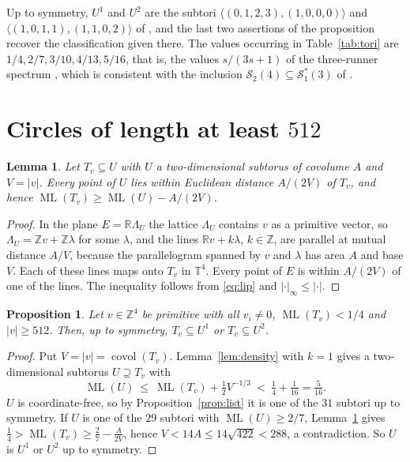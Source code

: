 \documentclass[12pt]{amsart}
\newtheorem{lemma}[theorem]{Lemma}
\newtheorem{proposition}[theorem]{Proposition}
\theoremstyle{definition}\newtheorem{definition}[theorem]{Definition}
\theoremstyle{remark}\newtheorem{remark}[theorem]{Remark}
\newcommand{\Z}{\mathbb Z}\newcommand{\R}{\mathbb R}\newcommand{\T}{\mathbb T}
\newcommand{\ML}{\operatorname{ML}}
\newcommand{\covol}{\operatorname{covol}}
\newcommand{\supn}[1]{\lvert #1\rvert_\infty}
\newcommand{\eucl}[1]{\lvert #1\rvert}
\newcommand{\Uone}{U^{1}}\newcommand{\Utwo}{U^{2}}
\begin{document}
Up to symmetry, $\Uone$ and $\Utwo$ are the subtori $\langle(0,1,2,3),(1,0,0,0)\rangle$ and $\langle(1,0,1,1),(1,1,0,2)\rangle$ of \cite[Section~3.3]{JainKravitz}, and the last two assertions of the proposition recover the classification given there. The values occurring in Table~\ref{tab:tori} are $1/4,2/7,3/10,4/13,5/16$, that is, the values $s/(3s+1)$ of the three-runner spectrum \cite[Theorem~7.2]{Kravitz}, which is consistent with the inclusion $\mathcal S_2(4)\subseteq\mathcal S^*_1(3)$ of \cite{GiriKravitz}.

\section{Circles of length at least $512$}
\begin{lemma}\label{lem:strip}
Let $T_v\subseteq U$ with $U$ a two-dimensional subtorus of covolume $A$ and $V=\eucl v$. Every point of $U$ lies within Euclidean distance $A/(2V)$ of $T_v$, and hence $\ML(T_v)\ge\ML(U)-A/(2V)$.
\end{lemma}
\begin{proof}
In the plane $E=\R\Lambda_U$ the lattice $\Lambda_U$ contains $v$ as a primitive vector, so $\Lambda_U=\Z v+\Z\lambda$ for some $\lambda$, and the lines $\R v+k\lambda$, $k\in\Z$, are parallel at mutual distance $A/V$, because the parallelogram spanned by $v$ and $\lambda$ has area $A$ and base $V$. Each of these lines maps onto $T_v$ in $\T^4$. Every point of $E$ is within $A/(2V)$ of one of the lines. The inequality follows from \eqref{eq:lip} and $\supn{\cdot}\le\eucl{\cdot}$.
\end{proof}

\begin{proposition}\label{prop:large}
Let $v\in\Z^4$ be primitive with all $v_i\ne 0$, $\ML(T_v)<1/4$ and $\eucl v\ge 512$. Then, up to symmetry, $T_v\subseteq\Uone$ or $T_v\subseteq\Utwo$.
\end{proposition}
\begin{proof}
Put $V=\eucl v=\covol(T_v)$. Lemma~\ref{lem:density} with $k=1$ gives a two-dimensional subtorus $U\supseteq T_v$ with
\[
 \ML(U)\ \le\ \ML(T_v)+\tfrac12V^{-1/3}\ <\ \tfrac14+\tfrac1{16}=\tfrac5{16}.
\]
$U$ is coordinate-free, so by Proposition~\ref{prop:list} it is one of the $31$ subtori up to symmetry. If $U$ is one of the $29$ subtori with $\ML(U)\ge 2/7$, Lemma~\ref{lem:strip} gives $\frac14>\ML(T_v)\ge\frac27-\frac{A}{2V}$, hence $V<14A\le 14\sqrt{422}<288$, a contradiction. So $U$ is $\Uone$ or $\Utwo$ up to symmetry.
\end{proof}
\end{document}
